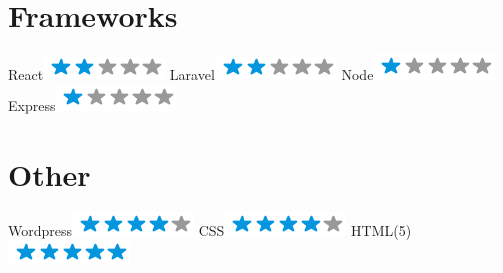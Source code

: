 \begin{aside}
    \section{Frameworks}
      React\includegraphics[scale=0.40]{img/2stars.png}
      Laravel\includegraphics[scale=0.40]{img/2stars.png}
      Node\includegraphics[scale=0.40]{img/1stars.png}
      Express\includegraphics[scale=0.40]{img/1stars.png}
    \section{Other}
      Wordpress\includegraphics[scale=0.40]{img/4stars.png}
      CSS\includegraphics[scale=0.40]{img/4stars.png}
      HTML(5)\includegraphics[scale=0.40]{img/5stars.png}
  \end{aside}